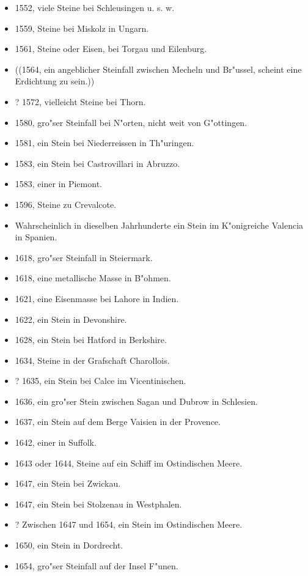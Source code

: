 \documentclass[a4paper, 11pt, oneside, polutonikogreek, german]{article}
\begin{document}
\begin{itemize}
    \item 1552, viele Steine bei Schleusingen u. s. w.
    \item 1559, Steine bei Miskolz in Ungarn.
    \item 1561, Steine oder Eisen, bei Torgau und Eilenburg.
    \item ((1564, ein angeblicher Steinfall zwischen Mecheln und Br"ussel, scheint eine Erdichtung zu sein.))
    \item ? 1572, vielleicht Steine bei Thorn.
    \item 1580, gro"ser Steinfall bei N"orten, nicht weit von G"ottingen.
    \item 1581, ein Stein bei Niederreissen in Th"uringen.
    \item 1583, ein Stein bei Castrovillari in Abruzzo.
    \item 1583, einer in Piemont.
    \item 1596, Steine zu Crevalcote.
    \item Wahrscheinlich in dieselben Jahrhunderte ein Stein im K"onigreiche Valencia in Spanien.
    \item 1618, gro"ser Steinfall in Steiermark.
    \item 1618, eine metallische Masse in B"ohmen.
    \item 1621, eine Eisenmasse bei Lahore in Indien.
    \item 1622, ein Stein in Devonshire.
    \item 1628, ein Stein bei Hatford in Berkshire.
    \item 1634, Steine in der Grafschaft Charollois.
    \item ? 1635, ein Stein bei Calce im Vicentinischen.
    \item 1636, ein gro"ser Stein zwischen Sagan und Dubrow in Schlesien.
    \item 1637, ein Stein auf dem Berge Vaisien in der Provence.
    \item 1642, einer in Suffolk.
    \item 1643 oder 1644, Steine auf ein Schiff im Ostindischen Meere.
    \item 1647, ein Stein bei Zwickau.
    \item 1647, ein Stein bei Stolzenau in Westphalen.
    \item ? Zwischen 1647 und 1654, ein Stein im Ostindischen Meere.
    \item 1650, ein Stein in Dordrecht.
    \item 1654, gro"ser Steinfall auf der Insel F"unen.

\end{itemize}
\end{document}
